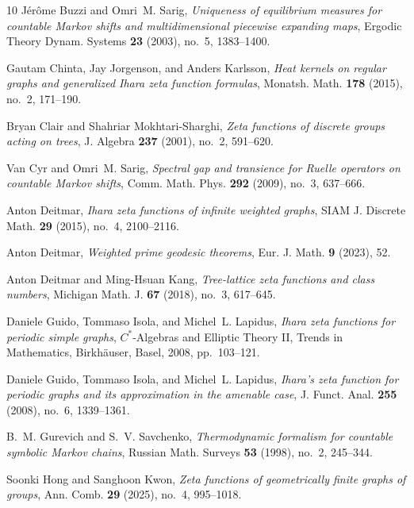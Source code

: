 \documentclass[11pt,reqno]{amsart}
\numberwithin{equation}{section}
\theoremstyle{definition}
\theoremstyle{remark}
\begin{document}
\begin{thebibliography}{10}
J{\'e}r{\^o}me Buzzi and Omri~M. Sarig, \emph{Uniqueness of equilibrium
  measures for countable {Markov} shifts and multidimensional piecewise
  expanding maps}, Ergodic Theory Dynam. Systems \textbf{23} (2003), no.~5,
  1383--1400.

Gautam Chinta, Jay Jorgenson, and Anders Karlsson, \emph{Heat kernels on
  regular graphs and generalized {Ihara} zeta function formulas}, Monatsh.
  Math. \textbf{178} (2015), no.~2, 171--190.

Bryan Clair and Shahriar Mokhtari-Sharghi, \emph{Zeta functions of discrete
  groups acting on trees}, J. Algebra \textbf{237} (2001), no.~2, 591--620.

Van Cyr and Omri~M. Sarig, \emph{Spectral gap and transience for {Ruelle}
  operators on countable {Markov} shifts}, Comm. Math. Phys. \textbf{292}
  (2009), no.~3, 637--666.

Anton Deitmar, \emph{{Ihara} zeta functions of infinite weighted graphs}, SIAM
  J. Discrete Math. \textbf{29} (2015), no.~4, 2100--2116.

Anton Deitmar, \emph{Weighted prime geodesic theorems}, Eur. J. Math.
  \textbf{9} (2023), 52.

Anton Deitmar and Ming-Hsuan Kang, \emph{Tree-lattice zeta functions and class
  numbers}, Michigan Math. J. \textbf{67} (2018), no.~3, 617--645.

Daniele Guido, Tommaso Isola, and Michel~L. Lapidus, \emph{{Ihara} zeta
  functions for periodic simple graphs}, {$C^*$}-Algebras and Elliptic Theory
  II, Trends in Mathematics, Birkh{\"a}user, Basel, 2008, pp.~103--121.

Daniele Guido, Tommaso Isola, and Michel~L. Lapidus, \emph{{Ihara}'s zeta
  function for periodic graphs and its approximation in the amenable case}, J.
  Funct. Anal. \textbf{255} (2008), no.~6, 1339--1361.

B.~M. Gurevich and S.~V. Savchenko, \emph{Thermodynamic formalism for countable
  symbolic {Markov} chains}, Russian Math. Surveys \textbf{53} (1998), no.~2,
  245--344.

Soonki Hong and Sanghoon Kwon, \emph{Zeta functions of geometrically finite
  graphs of groups}, Ann. Comb. \textbf{29} (2025), no.~4, 995--1018.


\end{thebibliography}
\end{document}
